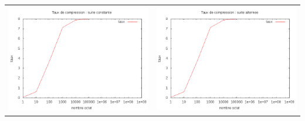 \documentclass{report}
\begin{document}
\subparagraph*{}
\hspace{-2cm}\begin{tabular}{l | l}
\includegraphics[width=7cm]{HConstant.png} & 
\includegraphics[width=7cm]{alternerH.png}
\end{tabular}
\end{document}
